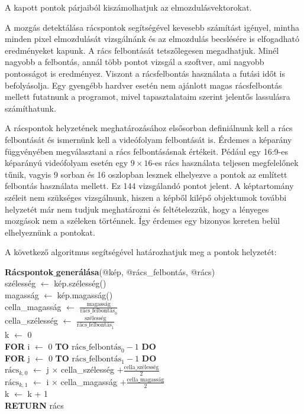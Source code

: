 A kapott pontok párjaiból kiszámolhatjuk az elmozdulásvektorokat.

A mozgás detektálása rácspontok segítségével kevesebb számítást igényel, mintha minden pixel elmozdulását vizsgálnánk és az elmozdulás becslésére is elfogadható eredményeket kapunk.
A rács felbontását tetszőlegesen megadhatjuk. Minél nagyobb a felbontás, annál több pontot vizsgál a szoftver, ami nagyobb pontosságot is eredményez. Viszont a rácsfelbontás használata a futási időt is befolyásolja. Egy gyengébb hardver esetén nem ajánlott magas rácsfelbontás mellett futatnunk a programot, mivel tapasztalataim szerint jelentős lassulásra számíthatunk.

A rácspontok helyzetének meghatározásához elsősorban definiálnunk kell a rács felbontását és ismernünk kell a videófolyam felbontását is. Érdemes a képarány függvényében megválasztani a rács felbontásásnak értékeit. Pédául egy 16:9-es képarányú videófolyam esetén egy $9 \times 16$-es rács használata teljesen megfelelőnek tűnik, vagyis 9 sorban és 16 oszlopban lesznek elhelyezve a pontok az említett felbontás használata mellett. Ez 144 vizsgálandó pontot jelent.
A képtartomány széleit nem szükséges vizsgálnunk, hiszen a képből kilépő objektumok további helyzetét már nem tudjuk meghatározni és feltételezzük, hogy a lényeges mozgások nem a széleken történnek. Így érdemes egy bizonyos kereten belül elhelyeznünk a pontokat.

\bigskip

\noindent A következő algoritmus segítségével határozhatjuk meg a pontok helyzetét:

\medskip

\noindent \textbf{Rácspontok$\_$generálása}(@kép, @rács\_felbontás, @rács)\\
szélesség $\leftarrow$ kép.szélesség()\\
magasság $\leftarrow$  kép.magasság()\\
cella\_magasság $\leftarrow$ $\frac{\text{magasság}}{\text{rács\_felbontás}_0}$\\
cella\_szélesség $\leftarrow$ $\frac{\text{szélesség}}{\text{rács\_felbontás}_1}$\\
k $\leftarrow$ 0\\
\textbf{FOR} i $\leftarrow$ 0 \textbf{TO} $\text{rács\_felbontás}_0-1$ \textbf{DO}\\
\indent \textbf{FOR} j $\leftarrow$ 0 \textbf{TO} $\text{rács\_felbontás}_1-1$ \textbf{DO}\\
\indent \indent $\text{rács}_{k,0}$ $\leftarrow$ j $\times$ cella\_szélesség $+ \frac{\text{cella\_szélesség}}{2}$\\
\indent \indent $\text{rács}_{k,1}$ $\leftarrow$ i $\times$ cella\_magasság $+ \frac{\text{cella\_magasság}}{2}$\\
\indent \indent k $\leftarrow$ k + 1\\
\textbf{RETURN} rács

